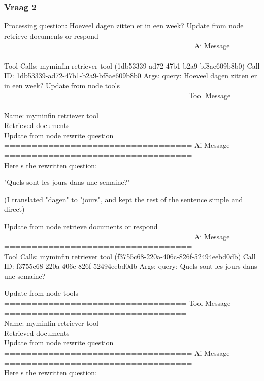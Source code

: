 \subsubsection{Vraag 2}
Processing question: Hoeveel dagen zitten er in een week?
Update from node retrieve documents or respond
\\[1em]
================================== Ai Message ==================================
\\[1em]
Tool Calls:
myminfin retriever tool (1db53339-ad72-47b1-b2a9-bf8ae609b8b0)
Call ID: 1db53339-ad72-47b1-b2a9-bf8ae609b8b0
Args:
query: Hoeveel dagen zitten er in een week?
Update from node tools
\\[1em]
================================= Tool Message =================================
\\[1em]
Name: myminfin retriever tool
\\[1em]
Retrieved documents
\\[1em]

Update from node rewrite question
\\[1em]
================================== Ai Message ==================================
\\[1em]
Here s the rewritten question:

"Quels sont les jours dans une semaine?" 

(I translated "dagen" to "jours", and kept the rest of the sentence simple and direct)

Update from node retrieve documents or respond
\\[1em]
================================== Ai Message ==================================
\\[1em]
Tool Calls:
myminfin retriever tool (f3755c68-220a-406c-826f-52494eebd0db)
Call ID: f3755c68-220a-406c-826f-52494eebd0db
Args:
query: Quels sont les jours dans une semaine?

Update from node tools
\\[1em]
================================= Tool Message =================================
\\[1em]
Name: myminfin retriever tool
\\[1em]
Retrieved documents
\\[1em]

Update from node rewrite question
\\[1em]
================================== Ai Message ==================================
\\[1em]

Here s the rewritten question:

